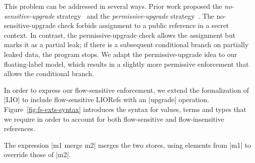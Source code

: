This problem can be addressed in several ways. Prior work proposed the
\emph{no-sensitive-upgrade} strategy~\citep{?} and the
\emph{permissive-upgrade} strategy~\citep{?}. The no-sensitive-upgrade
check forbids assignment to a public reference in a secret context. In
contrast, the permissive-upgrade check allows the assignment but marks
it as a partial leak; if there is a subsequent conditional branch on
partially leaked data, the program stops.  We adapt the
permissive-upgrade idea to our floating-label model, which results in
a slightly more permissive enforcement that allows the conditional
branch.

In order to express our flow-sensitive enforcement, we extend the
formalization of |LIO| to include flow-sensitive LIORefs with an
|upgrade| operation. Figure~\ref{fig:fs-exts-syntax} introduces the
syntax for values, terms and types that we require in order to account
for both flow-sensitive and flow-insensitive references.

The expression |m1 merge m2| merges the two stores, using elements
from |m1| to override those of |m2|.


%
%


